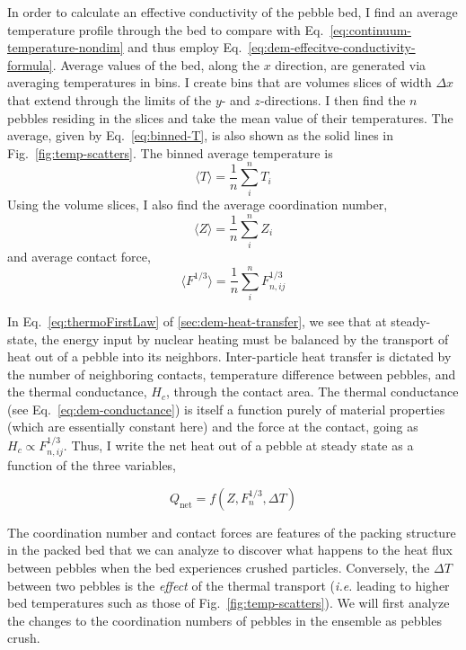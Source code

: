 In order to calculate an effective conductivity of the pebble bed, I find an average temperature profile through the bed to compare with Eq.~\ref{eq:continuum-temperature-nondim} and thus employ Eq.~\ref{eq:dem-effecitve-conductivity-formula}. Average values of the bed, along the $x$ direction, are generated via averaging temperatures in bins. I create bins that are volumes slices of width $\Delta x$ that extend through the limits of the $y$- and $z$-directions. I then find the $n$ pebbles residing in the slices and take the mean value of their temperatures. The average, given by Eq.~\ref{eq:binned-T}, is also shown as the solid lines in Fig.~\ref{fig:temp-scatters}. The binned average temperature is 
\begin{equation}\label{eq:binned-T}
    \langle T\rangle = \frac{1}{n}\sum_{i}^n T_i    
\end{equation}
Using the volume slices, I also find the average coordination number, 
\begin{equation}\label{eq:binned-z}
    \langle Z \rangle = \frac{1}{n}\sum_{i}^n Z_i
\end{equation}
and average contact force, 
\begin{equation}\label{eq:binned-f}
    \langle F^{1/3} \rangle = \frac{1}{n}\sum_{i}^n F_{n,ij}^{1/3}
\end{equation}


In Eq.~\ref{eq:thermoFirstLaw} of \cref{sec:dem-heat-transfer}, we see that at steady-state, the energy input by nuclear heating must be balanced by the transport of heat out of a pebble into its neighbors. Inter-particle heat transfer is dictated by the number of neighboring contacts, temperature difference between pebbles, and the thermal conductance, $H_{c}$, through the contact area. The thermal conductance (see Eq.~\ref{eq:dem-conductance}) is itself a function purely of material properties  (which are essentially constant here) and the force at the contact, going as $H_{c} \propto F_{n,ij}^{1/3}$. Thus, I write the net heat out of a pebble at steady state as a function of the three variables,

\begin{equation}
    Q_\text{net} =f( Z, F_n^{1/3}, \Delta T)
\end{equation}

The coordination number and contact forces are features of the packing structure in the packed bed that we can analyze to discover what happens to the heat flux between pebbles when the bed experiences crushed particles. Conversely, the $\Delta T$ between two pebbles is the \textit{effect} of the thermal transport (\textit{i.e.} leading to higher bed temperatures such as those of Fig.~\ref{fig:temp-scatters}). We will first analyze the changes to the coordination numbers of pebbles in the ensemble as pebbles crush.


